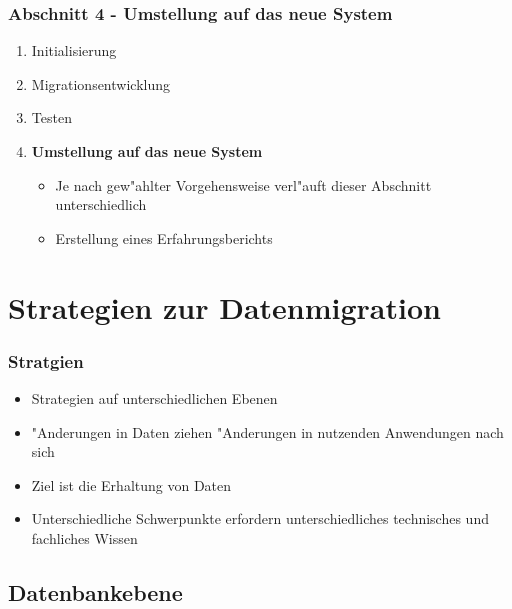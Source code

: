 \documentclass{beamer}
\begin{document}
	\begin{frame}
		\frametitle{Abschnitt 4 - Umstellung auf das neue System}
		
		\begin{enumerate}
			\item Initialisierung
			
			\item Migrationsentwicklung
			
			\item Testen
						
			\item \textbf{Umstellung auf das neue System}
			\begin{itemize}
				\item Je nach gew"ahlter Vorgehensweise verl"auft dieser Abschnitt unterschiedlich
				\newline
				\item Erstellung eines Erfahrungsberichts
			\end{itemize}
			
		\end{enumerate}
	\end{frame}
	\section{Strategien zur Datenmigration}
	
	\begin{frame}
		\frametitle{Stratgien}
		
		\begin{itemize}
			\item Strategien auf unterschiedlichen Ebenen
			\item "Anderungen in Daten ziehen "Anderungen in nutzenden Anwendungen nach sich
			\item Ziel ist die Erhaltung von Daten
			\item Unterschiedliche Schwerpunkte erfordern unterschiedliches technisches und fachliches Wissen
		\end{itemize}
	\end{frame}
	
	\subsection{Datenbankebene}
	
\end{document}
